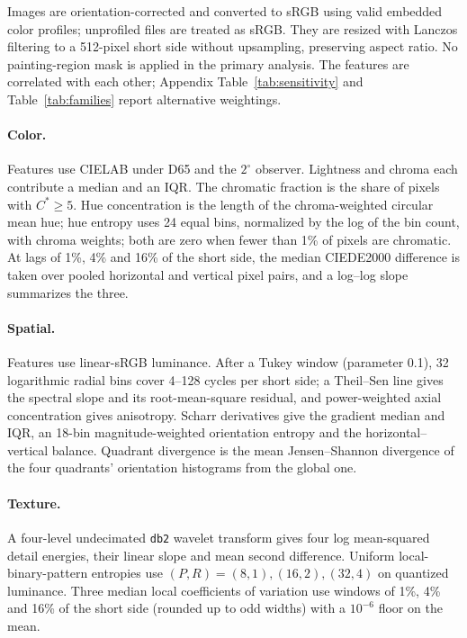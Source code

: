 Images are orientation-corrected and converted to sRGB using valid embedded color profiles;
unprofiled files are treated as sRGB. They are resized with Lanczos filtering to a 512-pixel
short side without upsampling, preserving aspect ratio. No painting-region mask is applied in
the primary analysis. The features are correlated with each other; Appendix
Table~\ref{tab:sensitivity} and Table~\ref{tab:families} report alternative weightings.

\paragraph{Color.} Features use CIELAB under D65 and the $2^\circ$ observer. Lightness and
chroma each contribute a median and an IQR. The chromatic fraction is the share of pixels with
$C^*\ge5$. Hue concentration is the length of the chroma-weighted circular mean hue; hue
entropy uses 24 equal bins, normalized by the log of the bin count, with chroma weights; both
are zero when fewer than 1\% of pixels are chromatic. At lags of 1\%, 4\% and 16\% of the short
side, the median CIEDE2000 difference \citep{sharma2005ciede} is taken over pooled horizontal
and vertical pixel pairs, and a log--log slope summarizes the three.

\paragraph{Spatial.} Features use linear-sRGB luminance. After a Tukey window (parameter 0.1),
32 logarithmic radial bins cover 4--128 cycles per short side; a Theil--Sen line gives the
spectral slope and its root-mean-square residual, and power-weighted axial concentration gives
anisotropy. Scharr derivatives give the gradient median and IQR, an 18-bin magnitude-weighted
orientation entropy and the horizontal--vertical balance. Quadrant divergence is the mean
Jensen--Shannon divergence of the four quadrants' orientation histograms from the global one.

\paragraph{Texture.} A four-level undecimated \texttt{db2} wavelet transform
\citep{mallat1989wavelet} gives four log mean-squared detail energies, their linear slope and
mean second difference. Uniform local-binary-pattern entropies \citep{ojala2002lbp} use
$(P,R)=(8,1),(16,2),(32,4)$ on quantized luminance. Three median local coefficients of
variation use windows of 1\%, 4\% and 16\% of the short side (rounded up to odd widths) with a
$10^{-6}$ floor on the mean.

